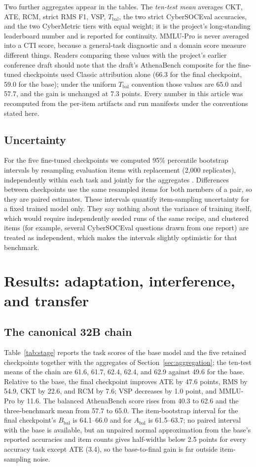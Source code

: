 \documentclass[preprint,12pt,authoryear]{elsarticle}
\newcommand{\Abal}{A_{\mathrm{bal}}}
\newcommand{\Bbal}{B_{\mathrm{bal}}}
\newcommand{\Tbal}{T_{\mathrm{bal}}}
\begin{document}
Two further aggregates appear in the tables. The \emph{ten-test mean} averages CKT, ATE, RCM, strict RMS F1, VSP, $\Tbal$, the two strict CyberSOCEval accuracies, and the two CyberMetric tiers with equal weight; it is the project's long-standing leaderboard number and is reported for continuity. MMLU-Pro is never averaged into a CTI score, because a general-task diagnostic and a domain score measure different things. Readers comparing these values with the project's earlier conference draft should note that the draft's AthenaBench composite for the fine-tuned checkpoints used Classic attribution alone (66.3 for the final checkpoint, 59.0 for the base); under the uniform $\Tbal$ convention those values are 65.0 and 57.7, and the gain is unchanged at 7.3 points. Every number in this article was recomputed from the per-item artifacts and run manifests under the conventions stated here.

\subsection{Uncertainty}\label{sec:uncertainty}
For the five fine-tuned checkpoints we computed 95\% percentile bootstrap intervals by resampling evaluation items with replacement (2,000 replicates), independently within each task and jointly for the aggregates \citep{efron1993bootstrap}. Differences between checkpoints use the same resampled items for both members of a pair, so they are paired estimates. These intervals quantify item-sampling uncertainty for a fixed trained model only. They say nothing about the variance of training itself, which would require independently seeded runs of the same recipe, and clustered items (for example, several CyberSOCEval questions drawn from one report) are treated as independent, which makes the intervals slightly optimistic for that benchmark.

\section{Results: adaptation, interference, and transfer}\label{sec:results}
\subsection{The canonical 32B chain}
Table~\ref{tab:stage} reports the task scores of the base model and the five retained checkpoints together with the aggregates of Section~\ref{sec:aggregation}; the ten-test means of the chain are 61.6, 61.7, 62.4, 62.4, and 62.9 against 49.6 for the base. Relative to the base, the final checkpoint improves ATE by 47.6 points, RMS by 54.9, CKT by 22.6, and RCM by 7.6; VSP decreases by 1.0 point, and MMLU-Pro by 11.6. The balanced AthenaBench score rises from 40.3 to 62.6 and the three-benchmark mean from 57.7 to 65.0. The item-bootstrap interval for the final checkpoint's $\Bbal$ is 64.1--66.0 and for $\Abal$ is 61.5--63.7; no paired interval with the base is available, but an unpaired normal approximation from the base's reported accuracies and item counts gives half-widths below 2.5 points for every accuracy task except ATE (3.4), so the base-to-final gain is far outside item-sampling noise.
\end{document}
